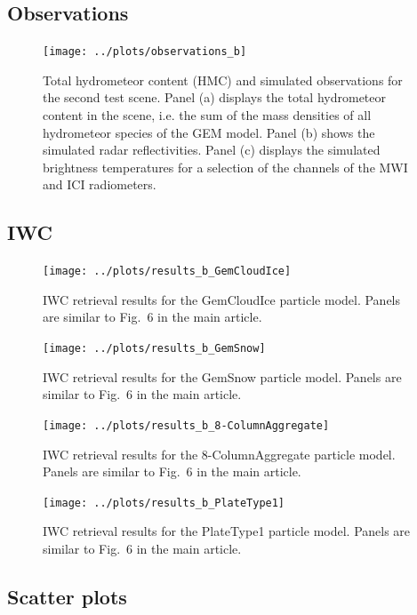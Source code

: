 \documentclass[journal abbreviation, manuscript]{copernicus}
\begin{document}
\subsection{Observations}
\begin{figure}[!hbpt]
\centering
\texttt{[image: ../plots/observations\_b]}
\caption{Total hydrometeor content (HMC) and simulated observations for the second test
  scene. Panel (a) displays the total hydrometeor content in the scene, i.e. the
  sum of the mass densities of all hydrometeor species of the GEM model. Panel
  (b) shows the simulated radar reflectivities. Panel (c) displays the simulated
  brightness temperatures for a selection of the channels of the MWI and ICI
  radiometers.}
\end{figure}

\clearpage


\subsection{IWC}

\begin{figure}[!hbpt]
\centering
\texttt{[image: ../plots/results\_b\_GemCloudIce]}
\caption{IWC retrieval results for the GemCloudIce particle model. Panels
  are similar to Fig.~6 in the main article.}
\end{figure}
\clearpage

\begin{figure}[!hbpt]
\centering
\texttt{[image: ../plots/results\_b\_GemSnow]}
\caption{IWC retrieval results for the GemSnow particle model. Panels
  are similar to Fig.~6 in the main article.}
\end{figure}
\clearpage

\begin{figure}[!hbpt]
\centering
\texttt{[image: ../plots/results\_b\_8-ColumnAggregate]}
\caption{IWC retrieval results for the 8-ColumnAggregate particle model. Panels
  are similar to Fig.~6 in the main article.}
\end{figure}
\clearpage

\begin{figure}[!hbpt]
\centering
\texttt{[image: ../plots/results\_b\_PlateType1]}
\caption{IWC retrieval results for the PlateType1 particle model. Panels
  are similar to Fig.~6 in the main article.}
\end{figure}
\clearpage

\subsection{Scatter plots}
\end{document}
